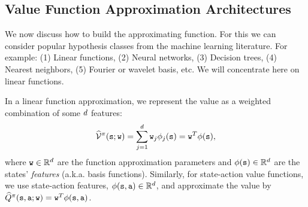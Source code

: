 
\subsection{Value Function Approximation Architectures}\label{ssec:value_func_approx_arch}

We now discuss how to build the approximating function. For this we can consider popular hypothesis classes from the machine learning literature. 
For example: (1) Linear
functions, (2) Neural networks, (3) Decision trees, (4) Nearest
neighbors, (5) Fourier or wavelet basis, etc. We will concentrate
here on linear functions.

In a linear function approximation, we represent the value as a weighted combination of some $d$ features:
$$\widehat{\mathcal{V}}^\pi({\tt s};{\tt w}) = \sum_{j=1}^d {\tt w}_j \phi_j({\tt s}) = {\tt w}^T \phi({\tt s}),$$
where ${\tt w} \in \mathbb{R}^d$ are the function approximation parameters and $\phi({\tt s}) \in \mathbb{R}^d$ are the states' \emph{features} (a.k.a. basis functions). Similarly, for state-action value functions, we use state-action features, $\phi({\tt s},{\tt a})\in \mathbb{R}^d$, and approximate the value by $\widehat{Q}^\pi({\tt s},{\tt a};{\tt w}) =  {\tt w}^T \phi({\tt s},{\tt a})$.

